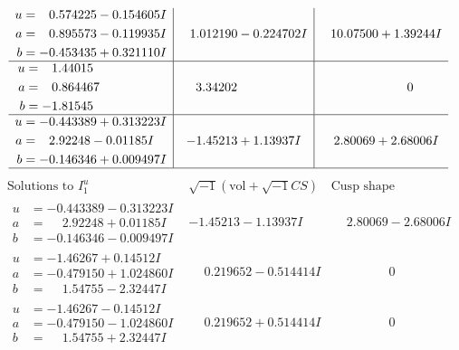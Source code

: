 \documentclass[1p]{elsarticle_modified}
\theoremstyle{definition}
\newcommand{\I}{\sqrt{-1}}
\begin{document}
$$\begin{array}{c|c|c}
\begin{aligned}
u &= \phantom{-}0.574225 - 0.154605 I \\
a &= \phantom{-}0.895573 - 0.119935 I \\
b &= -0.453435 + 0.321110 I\end{aligned}
 & \phantom{-}1.012190 - 0.224702 I & \phantom{-}10.07500 + 1.39244 I \\ \hline\begin{aligned}
u &= \phantom{-}1.44015\phantom{ +0.000000I} \\
a &= \phantom{-}0.864467\phantom{ +0.000000I} \\
b &= -1.81545\phantom{ +0.000000I}\end{aligned}
 & \phantom{-}3.34202\phantom{ +0.000000I} & \phantom{-0.000000 } 0 \\ \hline\begin{aligned}
u &= -0.443389 + 0.313223 I \\
a &= \phantom{-}2.92248 - 0.01185 I \\
b &= -0.146346 + 0.009497 I\end{aligned}
 & -1.45213 + 1.13937 I & \phantom{-}2.80069 + 2.68006 I\\
 \hline 
 \end{array}$$\newpage$$\begin{array}{c|c|c}  
\text{Solutions to }I^u_{1}& \I (\text{vol} + \sqrt{-1}CS) & \text{Cusp shape}\\
 \hline 
\begin{aligned}
u &= -0.443389 - 0.313223 I \\
a &= \phantom{-}2.92248 + 0.01185 I \\
b &= -0.146346 - 0.009497 I\end{aligned}
 & -1.45213 - 1.13937 I & \phantom{-}2.80069 - 2.68006 I \\ \hline\begin{aligned}
u &= -1.46267 + 0.14512 I \\
a &= -0.479150 + 1.024860 I \\
b &= \phantom{-}1.54755 - 2.32447 I\end{aligned}
 & \phantom{-}0.219652 - 0.514414 I & \phantom{-0.000000 } 0 \\ \hline\begin{aligned}
u &= -1.46267 - 0.14512 I \\
a &= -0.479150 - 1.024860 I \\
b &= \phantom{-}1.54755 + 2.32447 I\end{aligned}
 & \phantom{-}0.219652 + 0.514414 I & \phantom{-0.000000 } 0 \\ \hline\begin{aligned}

\end{aligned}
\end{array}$$
\end{document}
